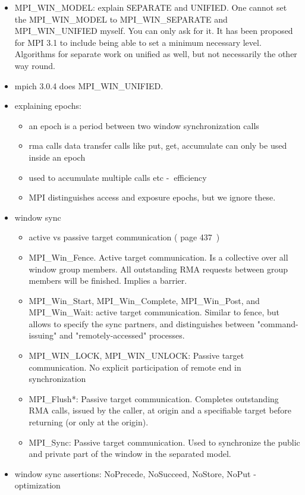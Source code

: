 \documentclass[a4paper, 10pt]{article}
\begin{document}
\begin{itemize}
\begin{itemize}
			\item MPI\_WIN\_MODEL: explain SEPARATE and UNIFIED. One cannot set the MPI\_WIN\_MODEL to MPI\_WIN\_SEPARATE and MPI\_WIN\_UNIFIED myself. You can only ask for it. It has been proposed for MPI 3.1 to include being able to set a minimum necessary level. Algorithms for separate work on unified as well, but not necessarily the other way round.
			\item mpich 3.0.4 does MPI\_WIN\_UNIFIED.
			\item explaining epochs:
				\begin{itemize}
					\item an epoch is a period between two window synchronization calls
					\item rma calls data transfer calls like put, get, accumulate can only be used inside an epoch
					\item used to accumulate multiple calls etc -$\>$ efficiency
					\item MPI distinguishes access and exposure epochs, but we ignore these.
				\end{itemize}
			\item window sync
				\begin{itemize}
					\item active vs passive target communication (\cite{mpi3} page 437~)
					\item MPI\_Win\_Fence. Active target communication. Is a collective over all window group members. All outstanding RMA requests between group members will be finished. Implies a barrier.
					\item MPI\_Win\_Start, MPI\_Win\_Complete, MPI\_Win\_Post, and MPI\_Win\_Wait: active target communication. Similar to fence, but allows to specify the sync partners, and distinguishes between "command-issuing" and "remotely-accessed" processes.
					\item MPI\_WIN\_LOCK, MPI\_WIN\_UNLOCK: Passive target communication. No explicit participation of remote end in synchronization
					\item MPI\_Flush*: Passive target communication. Completes outstanding RMA calls, issued by the caller, at origin and a specifiable target before returning (or only at the origin).
					\item MPI\_Sync: Passive target communication. Used to synchronize the public and private part of the window in the separated model.
				\end{itemize}
			\item window sync assertions: NoPrecede, NoSucceed, NoStore, NoPut -$\>$ optimization

\end{itemize}
\end{itemize}
\end{document}
